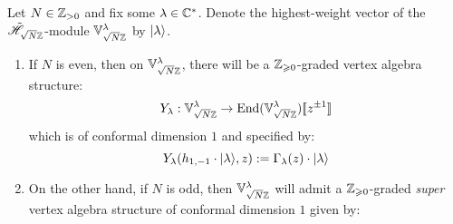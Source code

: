             \begin{proposition} \label{prop: (super)_VA_structures_on_weyl_vacuum_modules}
                Let $N \in \mathbb{Z}_{> 0}$ and fix some $\lambda \in \mathbb{C}^*$. Denote the highest-weight vector of the $\tilde{\mathscr{H}}_{\sqrt{N} \mathbb{Z}}$-module $\mathbb{V}_{\sqrt{N} \mathbb{Z}}^{\lambda}$ by $\lvert {\lambda} \rangle$. 
                \begin{enumerate}
                    \item If $N$ is even, then on $\mathbb{V}_{\sqrt{N} \mathbb{Z}}^{\lambda}$, there will be a $\mathbb{Z}_{\geqslant 0}$-graded vertex algebra structure:
                        $$Y_{\lambda}: \mathbb{V}_{\sqrt{N} \mathbb{Z}}^{\lambda} \to \mathrm{End}(\mathbb{V}_{\sqrt{N} \mathbb{Z}}^{\lambda})[\![z^{\pm 1}]\!]$$
                    which is of conformal dimension $1$ and specified by:
                        $$Y_{\lambda}(h_{1, -1} \cdot \lvert {\lambda} \rangle, z) := \Gamma_{\lambda}(z) \cdot \lvert {\lambda} \rangle$$
                    \item On the other hand, if $N$ is odd, then $\mathbb{V}_{\sqrt{N} \mathbb{Z}}^{\lambda}$ will admit a $\mathbb{Z}_{\geqslant 0}$-graded \textit{super} vertex algebra structure of conformal dimension $1$ given by:
                \end{enumerate}
            \end{proposition}
